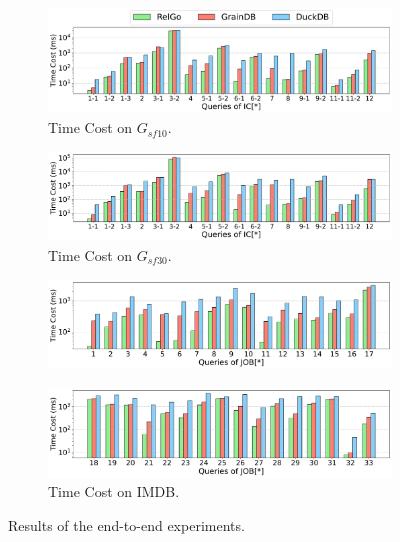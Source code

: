 \begin{figure}[ht]
    \centering
    \begin{subfigure}[b]{\linewidth}
        \centering
        \includegraphics[width=\linewidth]{./figures/exp/e2e_sf10.pdf}
        \caption{Time Cost on $G_{sf10}$.}
        \label{fig:exp-e2e-sf10}
    \end{subfigure}
    \begin{subfigure}[b]{\linewidth}
        \centering
        \includegraphics[width=\linewidth]{./figures/exp/e2e_sf30.pdf}
        \caption{Time Cost on $G_{sf30}$.}
        \label{fig:exp-e2e-sf30}
    \end{subfigure}
    \begin{subfigure}[b]{\linewidth}
        \centering
        \includegraphics[width=\linewidth]{./figures/exp/e2e_job_part1.pdf}
        \vspace*{-2ex}
    \end{subfigure}
    \begin{subfigure}[b]{\linewidth}
        \centering
        \includegraphics[width=\linewidth]{./figures/exp/e2e_job_part2.pdf}
        \caption{Time Cost on IMDB.}
        \label{fig:exp-e2e-job}
    \end{subfigure}
    \caption{Results of the end-to-end experiments.}
    \label{fig:exp-e2e}
\end{figure}

